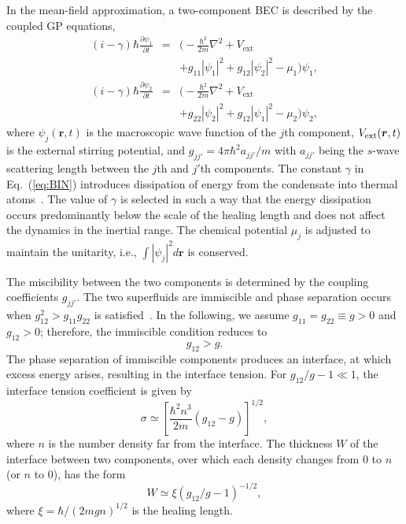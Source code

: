 \documentclass[pra,aps,superscriptaddress,twocolumn]{revtex4-2}
\begin{document}
In the mean-field approximation, a two-component BEC is described by the
coupled GP equations,
\begin{subequations}
\label{eq:BIN}
\begin{eqnarray}
			(i - \gamma)\hbar \frac{\partial \psi_1}{\partial t} & = & 
			\biggl(
				-\frac{\hbar^2}{2m}\nabla^2 + V_{\textrm{ext}}
			\nonumber \\
			& &
				+ g_{11}|\psi_1|^2 + g_{12}|\psi_2|^2 - \mu_1
			 \biggr) \psi_1,
			\\
			(i - \gamma)\hbar \frac{\partial \psi_2}{\partial t} & = & 
			\biggl(
				-\frac{\hbar^2}{2m}\nabla^2 + V_{\textrm{ext}}
				\nonumber \\
			& &
				+ g_{22}|\psi_2|^2 + g_{12}|\psi_1|^2 - \mu_2
			\biggr)\psi_2,
\end{eqnarray}
\end{subequations}
where $\psi_j(\bm{r}, t)$ is the macroscopic wave function of the $j$th
component, $V_{\rm ext}(\bm{r}, t)$ is the external stirring potential, and
$g_{jj'} = 4 \pi \hbar^2 a_{jj'} / m$ with $a_{jj'}$ being the $s$-wave
scattering length between the $j$th and $j'$th components.
The constant $\gamma$ in Eq.~(\ref{eq:BIN}) introduces dissipation of energy
from the condensate into thermal atoms~\cite{Choi}.
The value of $\gamma$ is selected in such a way that the energy dissipation
occurs predominantly below the scale of the healing length and does not
affect the dynamics in the inertial range.
The chemical potential $\mu_j$ is adjusted to maintain the unitarity, i.e.,
$\int |\psi_j|^2 d\bm{r}$ is conserved.

The miscibility between the two components is determined by the coupling
coefficients $g_{jj'}$.
The two superfluids are immiscible and phase separation occurs when
$g_{12}^2 > g_{11} g_{22}$ is satisfied~\cite{Pethick}.
In the following, we assume $g_{11} = g_{22} \equiv g > 0$ and $g_{12} > 0$;
therefore, the immiscible condition reduces to
\begin{equation} \label{im}
g_{12} > g.
\end{equation}
The phase separation of immiscible components produces an interface, at
which excess energy arises, resulting in the interface tension.
For $g_{12} / g - 1 \ll 1$, the interface tension coefficient is
given by~\cite{Ao, Barankov, Schae}
\begin{equation} \label{sigma}
\sigma \simeq \left[ \frac{\hbar^2 n^3}{2m} (g_{12} - g) \right]^{1/2},
\end{equation}
where $n$ is the number density far from the interface.
The thickness $W$ of the interface between two components, over which each
density changes from 0 to $n$ (or $n$ to 0), has the form
\begin{equation} \label{W}
W \simeq \xi (g_{12} / g - 1)^{-1/2},
\end{equation}
where $\xi = \hbar / (2mgn)^{1/2}$ is the healing length.
\end{document}
